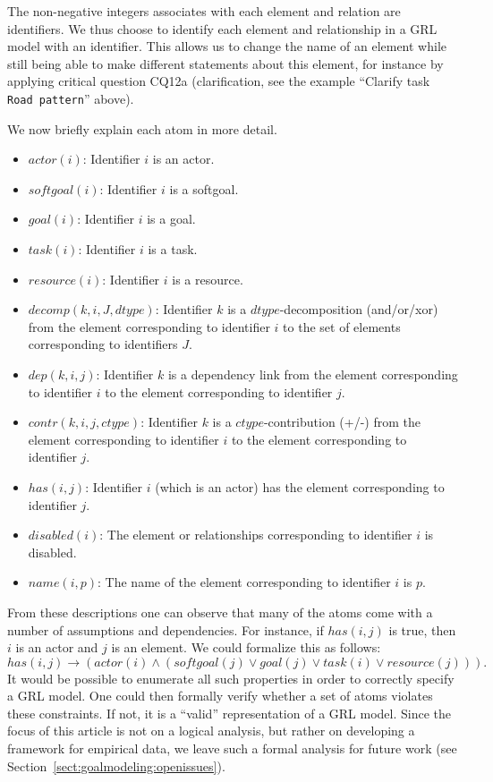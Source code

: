 The non-negative integers associates with each element and relation are identifiers. We thus choose to identify each element and relationship in a GRL model with an identifier. This allows us to change the name of an element while still being able to make different statements about this element, for instance by applying critical question CQ12a (clarification, see the example ``Clarify task \texttt{Road pattern}'' above). 

We now briefly explain each atom in more detail.
\begin{itemize}
\item $actor(i)$: Identifier $i$ is an actor.
\item $softgoal(i)$: Identifier $i$ is a softgoal.
\item $goal(i)$: Identifier $i$ is a goal.
\item $task(i)$: Identifier $i$ is a task.
\item $resource(i)$: Identifier $i$ is a resource.
\item $decomp(k,i,J,dtype)$: Identifier $k$ is a $dtype$-decomposition (and/or/xor) from the element corresponding to identifier $i$ to the set of elements corresponding to identifiers $J$.
\item $dep(k,i,j)$: Identifier $k$ is a dependency link from the element corresponding to identifier $i$ to the element corresponding to identifier $j$.
\item $contr(k,i,j,ctype)$: Identifier $k$ is a $ctype$-contribution (+/-) from the element corresponding to identifier $i$ to the element corresponding to identifier $j$.
\item $has(i,j)$: Identifier $i$ (which is an actor) has the element corresponding to identifier $j$.
\item $disabled(i)$: The element or relationships corresponding to identifier $i$ is disabled.
\item $name(i,p)$: The name of the element corresponding to identifier $i$ is $p$.
\end{itemize}

\begin{remark}
From these descriptions one can observe that many of the atoms come with a number of assumptions and dependencies. For instance, if $has(i,j)$ is true, then $i$ is an actor and $j$ is an element. We could formalize this as follows: $$has(i,j)\rightarrow (actor(i) \wedge (softgoal(j)\vee goal(j)\vee task(i) \vee resource(j))).$$ It would be possible to enumerate all such properties in order to correctly specify a GRL model. One could then formally verify whether a set of atoms violates these constraints. If not, it is a ``valid'' representation of a GRL model. Since the focus of this article is not on a logical analysis, but rather on developing a framework for empirical data, we leave such a formal analysis for future work (see Section~\ref{sect:goalmodeling:openissues}).
\end{remark}

